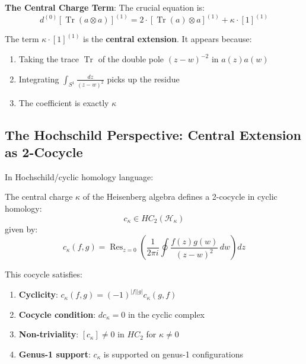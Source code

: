 \textbf{The Central Charge Term}:
The crucial equation is:
\begin{equation}
\boxed{d^{(0)}[\operatorname{Tr}(a \otimes a)]^{(1)} = 2 \cdot [\operatorname{Tr}(a) \otimes a]^{(1)} + \kappa \cdot [1]^{(1)}}
\end{equation}

The term $\kappa \cdot [1]^{(1)}$ is the \textbf{central extension}. It appears because:
\begin{enumerate}
\item Taking the trace $\operatorname{Tr}$ of the double pole $(z-w)^{-2}$ in $a(z)a(w)$
\item Integrating $\int_{S^1} \frac{dz}{(z-w)^2}$ picks up the residue
\item The coefficient is exactly $\kappa$
\end{enumerate}

\subsection{The Hochschild Perspective: Central Extension as 2-Cocycle}

In Hochschild/cyclic homology language:

\begin{theorem}
The central charge $\kappa$ of the Heisenberg algebra defines a 2-cocycle in cyclic homology:
\begin{equation}
c_\kappa \in HC_2(\mathcal{H}_\kappa)
\end{equation}
given by:
\begin{equation}
c_\kappa(f, g) = \operatorname{Res}_{z=0} \left( \frac{1}{2\pi i} \oint \frac{f(z) g(w)}{(z-w)^2} \, dw \right) dz
\end{equation}

This cocycle satisfies:
\begin{enumerate}
\item \textbf{Cyclicity}: $c_\kappa(f,g) = (-1)^{|f||g|} c_\kappa(g,f)$
\item \textbf{Cocycle condition}: $d c_\kappa = 0$ in the cyclic complex
\item \textbf{Non-triviality}: $[c_\kappa] \neq 0$ in $HC_2$ for $\kappa \neq 0$
\item \textbf{Genus-1 support}: $c_\kappa$ is supported on genus-1 configurations
\end{enumerate}
\end{theorem}


